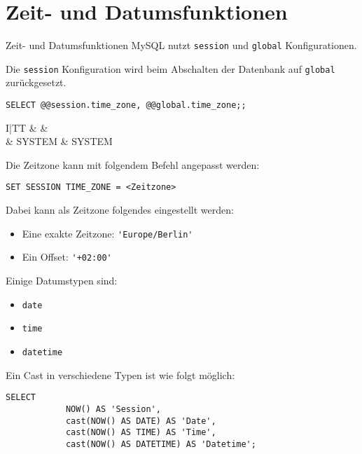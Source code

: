 \section{Zeit- und Datumsfunktionen}

\begin{sql}{Zeit- und Datumsfunktionen}
    MySQL nutzt \texttt{session} und \texttt{global} Konfigurationen.

    Die \texttt{session} Konfiguration wird beim Abschalten der Datenbank auf \texttt{global} zurückgesetzt.

    \begin{lstlisting}[language=mysql]
        SELECT @@session.time_zone, @@global.time_zone;;
    \end{lstlisting}

    \setcounter{rownum}{0}
    \begin{tabular}{I|TT}
        &  &  \\ & SYSTEM & SYSTEM \\
    \end{tabular}

    Die Zeitzone kann mit folgendem Befehl angepasst werden:

    \begin{lstlisting}[language=mysql]
        SET SESSION TIME_ZONE = <Zeitzone>
    \end{lstlisting}

    Dabei kann als Zeitzone folgendes eingestellt werden:

    \begin{itemize}
        \item Eine exakte Zeitzone: \lstinline[language=mysql]{'Europe/Berlin'}
        \item Ein Offset: \lstinline[language=mysql]{'+02:00'}
    \end{itemize}

    Einige Datumstypen sind:

    \begin{itemize}
        \item \texttt{date}
        \item \texttt{time}
        \item \texttt{datetime}
    \end{itemize}

    Ein Cast in verschiedene Typen ist wie folgt möglich:

    \begin{lstlisting}[language=mysql]
        SELECT
            NOW() AS 'Session',
            cast(NOW() AS DATE) AS 'Date',
            cast(NOW() AS TIME) AS 'Time',
            cast(NOW() AS DATETIME) AS 'Datetime';
    \end{lstlisting}


\end{sql}
